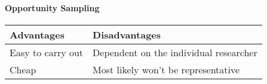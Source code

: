 \documentclass[
]{article}
\begin{document}
\hypertarget{opportunity-sampling-1}{%
\paragraph{Opportunity Sampling}\label{opportunity-sampling-1}}

\begin{longtable}[]{@{}
  >{\raggedright\arraybackslash}p{}
  >{\raggedright\arraybackslash}p{}@{}}
\toprule
Advantages & Disadvantages \\
\midrule
\endhead
Easy to carry out & Dependent on the individual researcher \\
Cheap & Most likely won't be representative \\
\bottomrule
\end{longtable}
\end{document}
